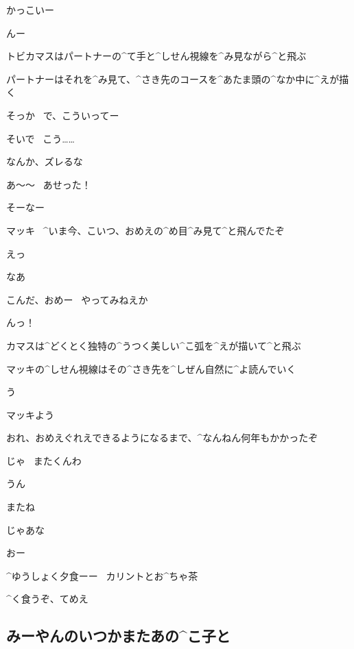 \Makki かっこいー

\Ayase んー

\page[155]
\Ayase トビカマスはパートナーの^{て}{手}と^{しせん}{視線}を^{み}{見}ながら^{と}{飛}ぶ

\Ayase パートナーはそれを^{み}{見}て、^{さき}{先}のコースを^{あたま}{頭}の^{なか}{中}に^{えが}{描}く

\Makki そっか
\ で、こういってー

\Ayase そいで
\ こう……

\Ayase なんか、ズレるな

\page[157]
\Makki あ〜〜
\ あせった！

\Ayase そーなー

\Ayase マッキ
\ ^{いま}{今}、こいつ、おめえの^{め}{目}^{み}{見}て^{と}{飛}んでたぞ

\Makki えっ

\Ayase なあ

\Ayase こんだ、おめー
\ やってみねえか

\page[158]
\Makki んっ！

\page[159]
\Ayase カマスは^{どくとく}{独特}の^{うつく}{美}しい^{こ}{弧}を^{えが}{描}いて^{と}{飛}ぶ

\Ayase マッキの^{しせん}{視線}はその^{さき}{先}を^{しぜん}{自然}に^{よ}{読}んでいく

\page[160]
\Makki う

\Ayase マッキよう

\Ayase おれ、おめえぐれえできるようになるまで、^{なんねん}{何年}もかかったぞ

\page[161]
\Ayase じゃ
\ またくんわ

\Makki うん

\page[162]
\Makki またね

\Ayase じゃあな

\Makki おー

\page[164]
\Ayase ^{ゆうしょく}{夕食}ーー
\ カリントとお^{ちゃ}{茶}

\Ayase ^{く}{食}うぞ、てめえ


\subsection{みーやんのいつかまたあの^{こ}{子}と}
